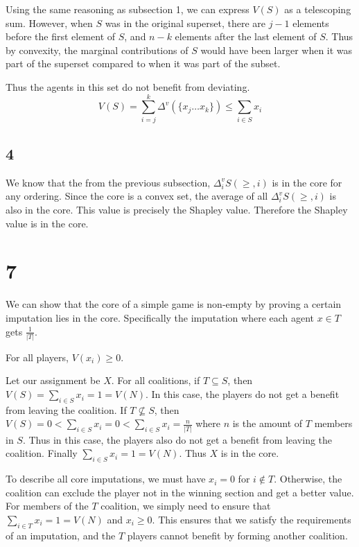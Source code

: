 \documentclass[12pt]{article}
\begin{document}
Using the same reasoning as subsection 1, we can express $V(S)$ as a telescoping sum. However, when $S$ was in the original superset, 
there are $j-1$ elements before the first element of $S$, and $n-k$ elements after the last element of $S$. Thus by convexity, the marginal 
contributions of $S$ would have been larger when it was part of the superset compared to when it was part of the subset. 

Thus the agents in this set do not benefit from deviating.
\[V(S) = \sum_{i = j}^{k} \Delta^v(\{x_j \ldots x_k\}) \leq \sum_{i \in S}x_i\]


\subsection*{4}
We know that the from the previous subsection, $\Delta_i^v S(\geq, i)$ is in the core for any ordering. Since the core is 
a convex set, the average of all $\Delta_i^v S(\geq, i)$ is also in the core. This value is precisely the Shapley value. 
Therefore the Shapley value is in the core.


\newpage
\section*{7}
We can show that the core of a simple game is non-empty by proving a
certain imputation lies in the core. Specifically the imputation where each
agent $x \in T$ gets $\frac{1}{|T|}$. 

For all players, $V(x_i) \geq 0$. 

Let our assignment be $X$. For all coalitions, if $T \subseteq S$, then $V(S) = \sum_{i \in S} x_i = 1 = V(N)$. 
In this case, the players do not get a benefit from leaving the coalition. If $T \not\subseteq S$, 
then $V(S) = 0 < \sum_{i \in S} x_i = 0 < \sum_{i \in S}x_i = \frac{n}{|T|}$ where $n$ is the amount of $T$ members in $S$.
Thus in this case, the players also do not get a benefit from leaving the coalition. Finally $\sum_{i \in S}x_i = 1 = V(N)$. 
Thus $X$ is in the core.

To describe all core imputations, we must have $x_i = 0$ for $i \not \in T$. Otherwise, the coalition 
can exclude the player not in the winning section and get a better value. For members of the $T$ coalition, we simply need to 
ensure that $\sum_{i \in T} x_i= 1 = V(N)$ and $x_i \geq 0$. This ensures that we satisfy the requirements of 
an imputation, and the $T$ players cannot benefit by forming another coalition. 
\end{document}
